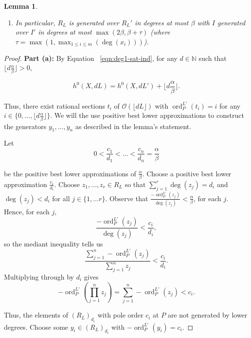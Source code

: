 \documentclass{amsart}
\theoremstyle{plain}
\newtheorem{lem}[thm]{Lemma}
\theoremstyle{definition}
\theoremstyle{remark}
\numberwithin{equation}{section}
\newcommand\BN{{\mathbb N}}
\newcommand\sco{{\mathscr O}}
\DeclareMathOperator{\ord}{ord}
\newcommand{\halfcan}{L}
\begin{document}
\begin{lem}
\begin{enumerate}
\item[(c)] In particular, $R_\halfcan$ is generated over $R_\halfcan'$
	in degrees at most $\beta$ with $I$ generated over $I'$ in
	degrees at most $\max(2 \beta, \beta + \tau)$ (where $\tau = \max(1,
	\max_{1 \leq i \leq m}(\deg(x_i)))$).
\end{enumerate}
\end{lem}

\begin{proof}
{\bf Part (a):}
By
Equation ~\ref{eqn:deg1-sat-ind}, for any $d
\in \BN$ such that $\lfloor d \frac{ \alpha}{\beta} \rfloor > 0$,

\[
	h^0 (X, d \halfcan ) = h^0(X, d\halfcan') + \lfloor d\frac{\alpha}{\beta}\rfloor.
\]

\noindent
Thus, there exist rational sections $t_i$ of $\sco(\lfloor d\halfcan \rfloor)$ with $\ord_P^{L'}(t_i) = i$
for any $i \in \{0, \ldots, \lfloor d \frac{\alpha}{
\beta} \rfloor \}$. We will the use positive best lower approximations to
construct the generators $y_1, \ldots, y_n$ as described in the lemma's statement.

Let 
\[
	0 < \frac{c_1}{d_1} < \ldots < \frac{c_n}{d_n} = \frac{\alpha}{
	\beta}
\]

\noindent
be the positive best lower approximations of $\frac{
\alpha}{\beta}$. 
Choose a positive best lower approximation $\frac{c_i}{d_i}$.  Choose $z_1, \ldots, z_r \in R_\halfcan$ so that $\sum_{j=1}^r \deg(z_j) = d_i$ and $\deg(z_j)<d_i$ for all $j\in \{1, \ldots r\}$. Observe that $\frac{-\ord_P^{\halfcan'}(z_j)}{\deg(z_j)}< \frac{\alpha}{\beta}$, for each $j$.  Hence, for each $j$, 
\[
	\frac{-\ord_P^{\halfcan'}(z_j)}{\deg(z_j)} < \frac{c_i}{d_i},
\]
so the mediant inequality tells us
\[
	\frac{\sum_{j=1}^n -\ord^{\halfcan'}_P(z_j)}{\sum_{j=1}^n z_j } < \frac{c_i}{d_i}.
\]
Multiplying through by $d_i$ gives
\[
	-\ord^{\halfcan'}_P \left(\prod_{j=1}^n z_j \right) = \sum_{j=1}^n -\ord^{\halfcan'}_P(z_j) < c_i .
\]

\noindent
Thus, the elements of $(R_{\halfcan})_{d_i}$ with pole order $c_i$ at $P$ are not generated by 
lower degrees. 
Choose some $y_i \in(R_{
\halfcan})_{d_i}$ with $-\ord_{P}^{L'}(y_i)=c_i$.


\end{proof}
\end{document}
